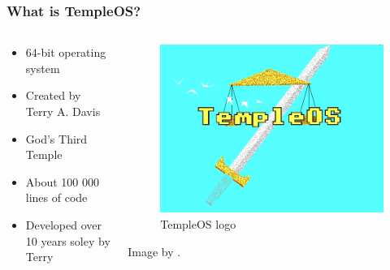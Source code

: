 \documentclass{beamer}
\begin{document}
	\begin{frame}
		\frametitle{What is TempleOS?}
		\begin{columns}
			\begin{column}{0.5\textwidth}
				\begin{itemize}
					\item 64-bit operating system

					\item Created by Terry A. Davis

					\item God's Third Temple

					\item About 100 000 lines of code

					\item Developed over 10 years soley by Terry
				\end{itemize}
			\end{column}

			\begin{column}{0.5\textwidth}
				\begin{figure}
					\centering
					\includegraphics[width=0.5\linewidth]{images/TempleOS_logo.png}
					\caption{TempleOS logo}
					\label{fig:tos_logo}
				\end{figure}
				\centering
				Image by \cite{davis_terry_2017}.
			\end{column}
		\end{columns}
	\end{frame}
\end{document}
